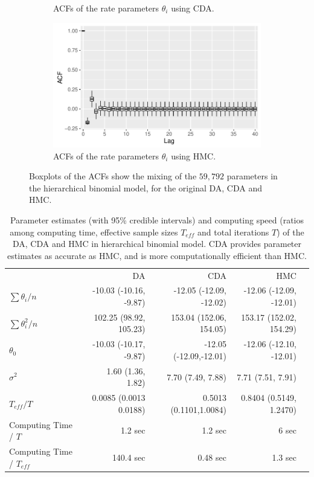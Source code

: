 \documentclass[10pt]{article}
\begin{document}
\begin{figure}[H]
\begin{subfigure}[b]{0.32\textwidth}
 \caption{ACFs of the rate parameters $\theta_i$ using CDA.}
 \end{subfigure} 
   \hfill 
 \begin{subfigure}[b]{0.32\textwidth}
 \includegraphics[width=1\textwidth]{binomial_random_acf_hmc.pdf}
 \caption{ACFs of the rate parameters $\theta_i$ using HMC.}
 \end{subfigure} 
 \caption{Boxplots of the ACFs show the mixing of the $59,792$ parameters in the hierarchical binomial model, for the original DA\citep{polson2013bayesian}, CDA and HMC.}
 \label{data_binomial}
 \end{figure}
 
 
 
\begin{table}[H]
\centering
\begin{tabular}{|l |r |r| r| r |} 
 \hline
                          & DA & CDA & HMC\\
 [0.5ex]

 $ \sum \theta_i/n$      & -10.03 (-10.16, -9.87)& -12.05 (-12.09, -12.02) &  -12.06 (-12.09, -12.01)\\
 $ \sum \theta_i^2/n$      & 102.25 (98.92, 105.23)& 153.04 (152.06, 154.05) &  153.17 (152.02, 154.29)\\
$\theta_0$          & -10.03 (-10.17, -9.87)& -12.05 (-12.09,-12.01) &  -12.06 (-12.10, -12.01)\\
$\sigma^2$         & 1.60 (1.36, 1.82)&   7.70 (7.49, 7.88)  & 7.71 (7.51, 7.91)\\
$T_{eff} / T$ & 0.0085 (0.0013 0.0188) & 0.5013 (0.1101,1.0084) & 0.8404 (0.5149, 1.2470)\\
Computing Time /  $T$  & 1.2 sec       & 1.2 sec        & 6 sec\\
Computing Time /  $T_{eff}$  & 140.4 sec       & 0.48 sec        & 1.3 sec\\
 \hline
\end{tabular}
\caption{Parameter estimates (with 95\% credible intervals) and computing speed (ratios among computing time, effective sample sizes $T_{eff}$ and total iterations $T$) of the DA, CDA and HMC in hierarchical binomial model. CDA provides parameter estimates as accurate as HMC, and is more computationally efficient than HMC.}
\label{tab:binomial}
\end{table}
\end{document}
